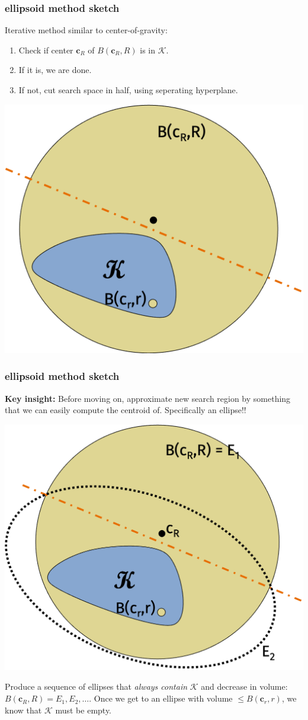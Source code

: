 \documentclass[compress]{beamer}
\newcommand{\bv}[1]{\mathbf{#1}}
\begin{document}
\begin{frame}[t]
	\frametitle{ellipsoid method sketch}
	Iterative method similar to center-of-gravity:
	\begin{enumerate}
		\item Check if center $\bv{c}_R$ of $B(\bv{c}_R, R)$ is in $\mathcal{K}$.
		\item If it is, we are done.
		\item  If not, cut search space in half, using seperating hyperplane. 
	\end{enumerate}
	\begin{center}
		\includegraphics[width=.5\textwidth]{ellipsoid1.png}
	\end{center}
\end{frame}

\begin{frame}[t]
	\frametitle{ellipsoid method sketch}
	\textbf{Key insight:} Before moving on, approximate new search region by something that we can easily compute the centroid of. Specifically an ellipse!!
	\vspace{-1em}
	\begin{center}
		\includegraphics[width=.5\textwidth]{ellipsoid2.png}
	\end{center}
	\vspace{-1em}
Produce a sequence of ellipses that \emph{always contain} $\mathcal{K}$ and decrease in volume: $B(\bv{c}_R, R) = E_1, E_2, \ldots$. Once we get to an ellipse with volume $\leq B(\bv{c}_r, r)$, we know that $\mathcal{K}$ must be empty.
\end{frame}
\end{document}
